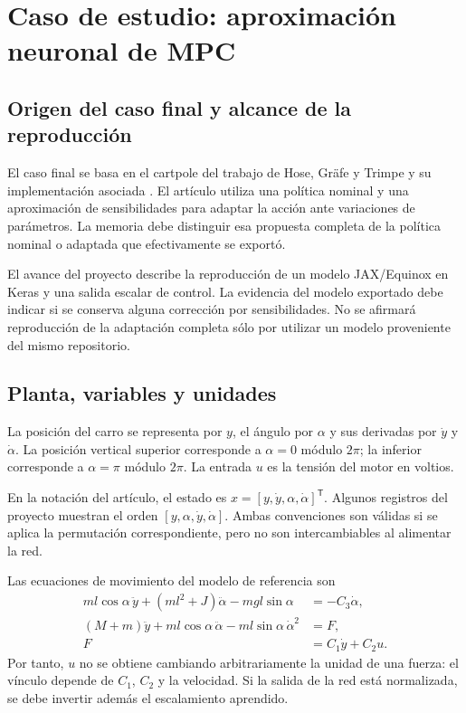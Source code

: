 \section{Caso de estudio: aproximación neuronal de MPC}\label{cap:mpc}
\subsection{Origen del caso final y alcance de la reproducción}
El caso final se basa en el cartpole del trabajo de Hose, Gräfe y Trimpe \cite{hose2024} y su implementación asociada \cite{hoserepo}. El artículo utiliza una política nominal y una aproximación de sensibilidades para adaptar la acción ante variaciones de parámetros. La memoria debe distinguir esa propuesta completa de la política nominal o adaptada que efectivamente se exportó.

El avance del proyecto describe la reproducción de un modelo JAX/Equinox en Keras y una salida escalar de control. La evidencia del modelo exportado debe indicar si se conserva alguna corrección por sensibilidades. No se afirmará reproducción de la adaptación completa sólo por utilizar un modelo proveniente del mismo repositorio.

\subsection{Planta, variables y unidades}
La posición del carro se representa por $y$, el ángulo por $\alpha$ y sus derivadas por $\dot y$ y $\dot\alpha$. La posición vertical superior corresponde a $\alpha=0$ módulo $2\pi$; la inferior corresponde a $\alpha=\pi$ módulo $2\pi$. La entrada $u$ es la tensión del motor en voltios.

En la notación del artículo, el estado es $x=[y,\dot y,\alpha,\dot\alpha]^\mathsf T$. Algunos registros del proyecto muestran el orden $[y,\alpha,\dot y,\dot\alpha]$. Ambas convenciones son válidas si se aplica la permutación correspondiente, pero no son intercambiables al alimentar la red.

Las ecuaciones de movimiento del modelo de referencia son
\begin{align}
ml\cos\alpha\,\ddot y+(ml^2+J)\ddot\alpha-mgl\sin\alpha&=-C_3\dot\alpha,\label{eq:pend1}\\
(M+m)\ddot y+ml\cos\alpha\,\ddot\alpha-ml\sin\alpha\,\dot\alpha^2&=F,\label{eq:pend2}\\
F&=C_1\dot y+C_2u.\label{eq:motor}
\end{align}
Por tanto, $u$ no se obtiene cambiando arbitrariamente la unidad de una fuerza: el vínculo depende de $C_1$, $C_2$ y la velocidad. Si la salida de la red está normalizada, se debe invertir además el escalamiento aprendido.


